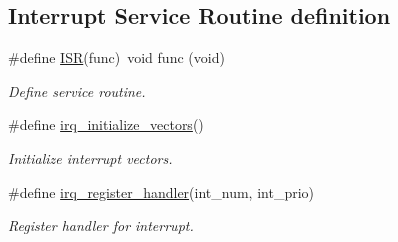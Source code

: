 \subsection*{Interrupt Service Routine definition}
\begin{DoxyCompactItemize}
\item 
\#define \hyperlink{group__interrupt__group_ga0da0a19156773eca7070722f26ff66a6}{I\+S\+R}(func)~void func (void)
\begin{DoxyCompactList}\small\item\em Define service routine. \end{DoxyCompactList}\item 
\#define \hyperlink{group__interrupt__group_ga931b667f6490ad3d8905fa25bebb24b1}{irq\+\_\+initialize\+\_\+vectors}()
\begin{DoxyCompactList}\small\item\em Initialize interrupt vectors. \end{DoxyCompactList}\item 
\#define \hyperlink{group__interrupt__group_gaa746642b1132af054826fb169f541965}{irq\+\_\+register\+\_\+handler}(int\+\_\+num,  int\+\_\+prio)
\begin{DoxyCompactList}\small\item\em Register handler for interrupt. \end{DoxyCompactList}\end{DoxyCompactItemize}
